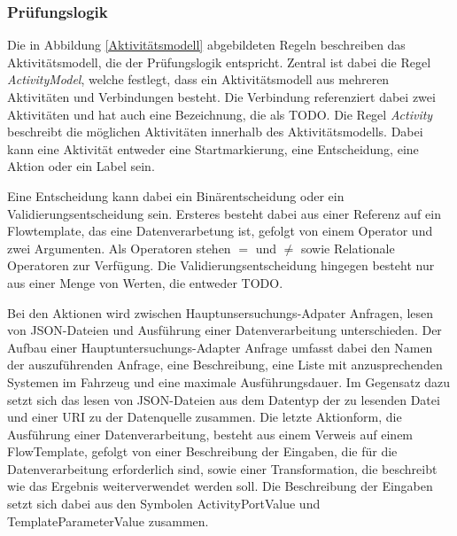 \documentclass{article}
\begin{document}
    \subsubsection{Prüfungslogik}
    Die in Abbildung \ref{Aktivitätsmodell} abgebildeten Regeln beschreiben das Aktivitätsmodell, die der Prüfungslogik entspricht. \cite{99}
    Zentral ist dabei die Regel \textit{ActivityModel}, welche festlegt, dass ein Aktivitätsmodell aus mehreren Aktivitäten und Verbindungen besteht.
    Die Verbindung referenziert dabei zwei Aktivitäten und hat auch eine Bezeichnung, die als TODO.
    Die Regel \textit{Activity} beschreibt die möglichen Aktivitäten innerhalb des Aktivitätsmodells. 
    Dabei kann eine Aktivität entweder eine Startmarkierung, eine Entscheidung, eine Aktion oder ein Label sein.
    
    Eine Entscheidung kann dabei ein Binärentscheidung oder ein Validierungsentscheidung sein.
    Ersteres besteht dabei aus einer Referenz auf ein Flowtemplate, das eine Datenverarbetung ist, gefolgt von einem Operator und zwei Argumenten. 
    Als Operatoren stehen $=$ und $\neq$ sowie Relationale Operatoren zur Verfügung.
    Die Validierungsentscheidung hingegen besteht nur aus einer Menge von Werten, die entweder TODO.

    Bei den Aktionen wird zwischen Hauptunsersuchungs-Adpater Anfragen, lesen von JSON-Dateien und Ausführung einer Datenverarbeitung unterschieden.
    Der Aufbau einer Hauptuntersuchungs-Adapter Anfrage umfasst dabei den Namen der auszuführenden Anfrage, eine Beschreibung, eine Liste mit anzusprechenden Systemen im Fahrzeug und eine maximale Ausführungsdauer.
    Im Gegensatz dazu setzt sich das lesen von JSON-Dateien aus dem Datentyp der zu lesenden Datei und einer URI zu der Datenquelle zusammen.
    Die letzte Aktionform, die Ausführung einer Datenverarbeitung, besteht aus einem Verweis auf einem FlowTemplate, gefolgt von einer Beschreibung der Eingaben, die für die Datenverarbeitung erforderlich sind, sowie einer Transformation, die beschreibt wie das Ergebnis weiterverwendet werden soll.    
    Die Beschreibung der Eingaben setzt sich dabei aus den Symbolen ActivityPortValue und TemplateParameterValue zusammen.
\end{document}
